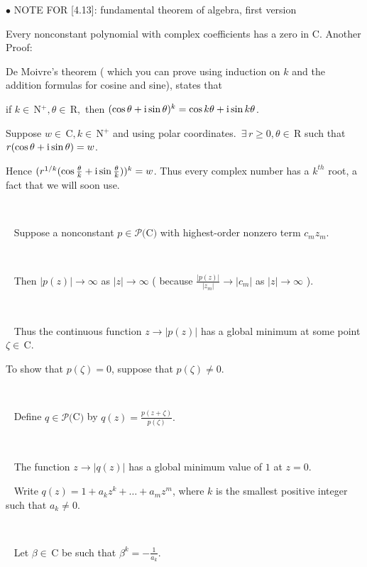 \documentclass[a4paper, 11pt, UTF8]{article}
\def\i{\textup{i}}
\def\Po{\mathcal{P}}
\def\Rbf{$\,{\timesbf R}\,$}
\def\Cbf{$\,{\timesbf C}\,$}
\def\Rbfc{$\,{\timesbf R}$}
\def\Cbfc{$\,{\timesbf C}$}
\def\Nbp{$\,{\timesbf N}$^+}
\begin{document}
\begin{large}
{\small $\bullet$ } {\timesbf\Large N{\normalsize OTE} F{\normalsize OR} [4.13]:} {\timessl fundamental theorem of algebra, first version}\par\quad
{\timessl Every nonconstant polynomial with complex coefficients has a zero in {\timesbf C}.} {\timessl\Large Another Proof:}\par\quad
De Moivre's theorem {\small( which you can prove using induction on $k$ and the addition formulas for cosine and sine)}, states that\par\quad
if $k\in\Nbp,\theta\in\Rbfc,$ then $(\cos\theta +\i\sin \theta)^k=\cos k\theta + \i \sin k\theta$.\par\quad
Suppose $w\in\Cbfc,k\in\Nbp$ and using polar coordinates. $\,\exists\,r\geq 0,\theta\in\Rbf\,$such that $r(\cos\theta + \i \sin\theta) = w$.\par\quad
Hence $(r^{1/k}(\cos\frac{\theta}{k} +\i\sin\frac{\theta}{k}))^k=w$. Thus every complex number has a {\timessl $k^{th}$ root}, a fact that we will soon use.\par{\tiny\,\par}\Large\,\,\,
Suppose a nonconstant $p\in\Po(${\timesbf C}$)$ with highest-order nonzero term $c_m z_m$.\par{\tiny\,\par}\,\,\,
Then $|p(z)|\rightarrow\infty$ as $|z|\rightarrow\infty$ ( because $\displaystyle\frac{|p(z)|}{|z_m|}\rightarrow|c_m|$ as $|z|\rightarrow\infty$ ).\par{\tiny\,\par}\,\,\,
Thus the continuous function $z\rightarrow|p(z)|$ has a global minimum at some point $\zeta\in\Cbfc.$\par\quad
To show that $p(\zeta) = 0$, suppose that $p(\zeta)\neq 0$.\par{\tiny\,\par}\,\,\,
Define $q\in\Po(${\timesbf C}$)$ by $q(z)=\displaystyle\frac{p(z+\zeta)}{p(\zeta)}.$\par{\tiny\,\par}\,\,\,
The function $z\rightarrow|q(z)|$ has a global minimum value of $1$ at $z = 0$.\par\,\,\,
Write $q(z) = 1 + a_k z^k + \dots + a_m z^m$, where $k$ is the smallest positive integer such that $a_k\neq 0$.\par{\tiny\,\par}\,\,\,
Let $\beta\in\Cbf\,$be such that $\displaystyle\beta^k=-\frac{1}{a_k}$.\par{\tiny\,\par}\,\,\,

\end{large}
\end{document}
